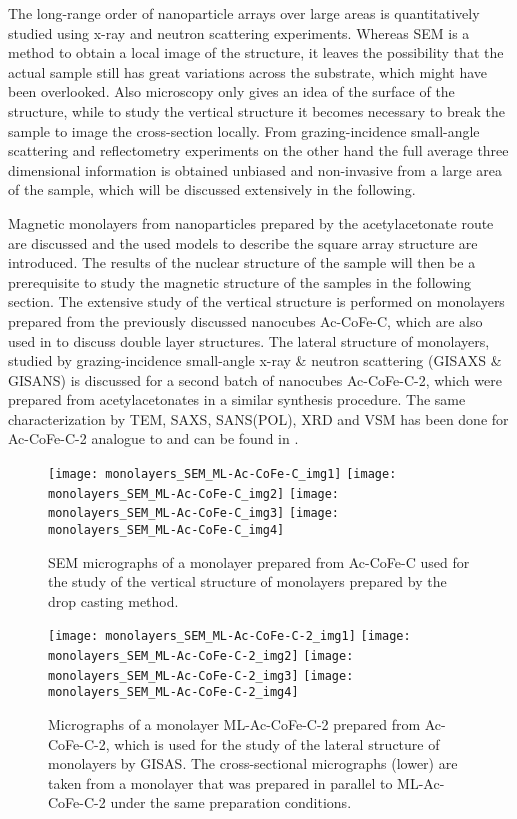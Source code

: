 \documentclass[\main/dresen_thesis.tex]{subfiles}
\begin{document}
  The long-range order of nanoparticle arrays over large areas is quantitatively studied using x-ray and neutron scattering experiments.
  Whereas SEM is a method to obtain a local image of the structure, it leaves the possibility that the actual sample still has great variations across the substrate, which might have been overlooked.
  Also microscopy only gives an idea of the surface of the structure, while to study the vertical structure it becomes necessary to break the sample to image the cross-section locally.
  From grazing-incidence small-angle scattering and reflectometry experiments on the other hand the full average three dimensional information is obtained unbiased and non-invasive from a large area of the sample, which will be discussed extensively in the following.

  Magnetic monolayers from nanoparticles prepared by the acetylacetonate route are discussed and the used models to describe the square array structure are introduced.
  The results of the nuclear structure of the sample will then be a prerequisite to study the magnetic structure of the samples in the following section.
  The extensive study of the vertical structure is performed on monolayers prepared from the previously discussed nanocubes Ac-CoFe-C, which are also used in  to discuss double layer structures.
  The lateral structure of monolayers, studied by grazing-incidence small-angle x-ray \& neutron scattering (GISAXS \& GISANS) is discussed for a second batch of nanocubes Ac-CoFe-C-2, which were prepared from acetylacetonates in a similar synthesis procedure.
  The same characterization by TEM, SAXS, SANS(POL), XRD and VSM has been done for Ac-CoFe-C-2 analogue to  and can be found in .

  \begin{figure}[tb]
    \centering
    \texttt{[image: monolayers\_SEM\_ML-Ac-CoFe-C\_img1]}
    \texttt{[image: monolayers\_SEM\_ML-Ac-CoFe-C\_img2]}
    \texttt{[image: monolayers\_SEM\_ML-Ac-CoFe-C\_img3]}
    \texttt{[image: monolayers\_SEM\_ML-Ac-CoFe-C\_img4]}
    \caption{\label{fig:monolayers:structure:semImagesMLACCoFeC}SEM micrographs of a monolayer prepared from Ac-CoFe-C used for the study of the vertical structure of monolayers prepared by the drop casting method.}
  \end{figure}

  \begin{figure}[tb]
    \centering
    \texttt{[image: monolayers\_SEM\_ML-Ac-CoFe-C-2\_img1]}
    \texttt{[image: monolayers\_SEM\_ML-Ac-CoFe-C-2\_img2]}
    \texttt{[image: monolayers\_SEM\_ML-Ac-CoFe-C-2\_img3]}
    \texttt{[image: monolayers\_SEM\_ML-Ac-CoFe-C-2\_img4]}
    \caption{\label{fig:monolayers:structure:semImagesMLACCoFeC2}Micrographs of a monolayer ML-Ac-CoFe-C-2 prepared from Ac-CoFe-C-2, which is used for the study of the lateral structure of monolayers by GISAS. The cross-sectional micrographs (lower) are taken from a monolayer that was prepared in parallel to ML-Ac-CoFe-C-2 under the same preparation conditions.}
  \end{figure}
\end{document}
